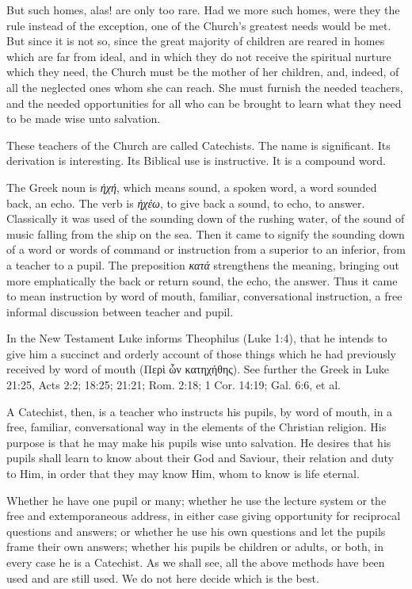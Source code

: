  But such homes, alas! are only too rare. Had we more such homes, were they the rule instead of the exception, one of the Church’s greatest needs would be met. But since it is not so, since the great majority
of children are reared in homes which are far from ideal, and in which they do not receive the spiritual nurture which they need, the Church must be the mother of her children, and, indeed, of all the neglected ones whom she can reach. She must furnish the needed teachers, and the needed opportunities for all who can be brought to learn what they need to be made wise unto salvation.

These teachers of the Church are called Catechists. The name is significant. Its derivation is interesting. Its Biblical use is instructive. It is a compound word.

The Greek noun is \emph{ἠχή}, which means sound, a spoken word, a word sounded back, an echo. The verb is \emph{ἠχέω}, to give back a sound, to echo, to answer. Classically it was used of the sounding down of the rushing water, of the sound of music falling from the ship on the sea. Then it came to signify the sounding down of a word or words of command or instruction from a superior to an inferior, from a teacher to a pupil. The preposition \emph{κατά} strengthens the meaning, bringing out more emphatically the back or return sound, the echo, the answer. Thus it came to mean instruction by word of mouth, familiar, conversational instruction, a free informal discussion between teacher and pupil.

In the New Testament Luke informs Theophilus (Luke 1:4), that he intends to give him a succinct and orderly account of those things which he had
previously received by word of mouth (Περὶ ὧν κατηχήθης). See further the Greek in Luke 21:25, Acts 2:2; 18:25; 21:21; Rom. 2:18; 1 Cor. 14:19; Gal. 6:6, et al.

 A Catechist, then, is a teacher who instructs his pupils, by word of mouth, in a free, familiar, conversational way in the elements of the Christian religion. His purpose is that he may make his pupils wise unto salvation. He desires that his pupils shall learn to know about their God and Saviour, their relation and duty to Him, in order that they may know Him, whom to know is life eternal.

Whether he have one pupil or many; whether he use the lecture system or the free and extemporaneous address, in either case giving opportunity for reciprocal questions and answers; or whether he use his own questions and let the pupils frame their own answers; whether his pupils be children or adults, or both, in every case he is a Catechist. As we shall see, all the above methods have been used and are still used. We do not here decide which is the best.


